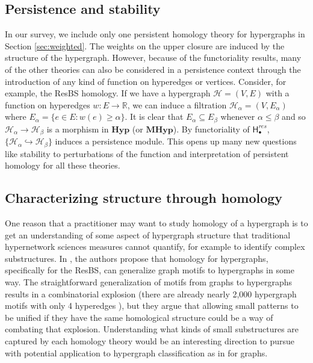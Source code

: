 \documentclass{amsart}
\newcommand{\R}{\mathbb{R}}
\newcommand{\Hyp}{\mathrm{\textbf{Hyp}}}
\newcommand{\MHyp}{\mathrm{\textbf{MHyp}}}
\newcommand{\Hgroup}	     {\mathsf{H}}
\renewcommand{\hom}[2]{\Hgroup_{#2}^{#1}}
\renewcommand{\H}{\mathcal{H}}
\begin{document}
\subsection*{Persistence and stability}
In our survey, we include only one persistent homology theory for hypergraphs in Section \ref{sec:weighted}. The weights on the upper closure are induced by the structure of the hypergraph. However, because of the functoriality results, many of the other theories can also be considered in a persistence context through the introduction of any kind of function on hyperedges or vertices. Consider, for example, the ResBS homology. If we have a hypergraph $\H=(V,E)$ with a function on hyperedges $w : E \rightarrow \R$, we can induce a filtration $\H_\alpha = (V, E_\alpha)$ where $E_\alpha = \{e \in E : w(e) \geq \alpha\}$. It is clear that $E_\alpha \subseteq E_\beta$ whenever $\alpha \leq \beta$ and so $\H_\alpha \rightarrow \H_\beta$ is a morphism in $\Hyp$ (or $\MHyp$). By functoriality of $\hom{res}{\bullet}$, $\{\H_\alpha \hookrightarrow \H_\beta\}$ induces a persistence module. This opens up many new questions like stability to perturbations of the function and interpretation of persistent homology for all these theories. 

\subsection*{Characterizing structure through homology}
One reason that a practitioner may want to study homology of a hypergraph is to get an understanding of some aspect of hypergraph structure that traditional hypernetwork sciences measures cannot quantify, for example to identify complex substructures. In \cite{jenne2023stepping}, the authors propose that homology for hypergraphs, specifically for the ResBS, can generalize graph motifs to hypergraphs in some way. The straightforward generalization of motifs from graphs to hypergraphs results in a combinatorial explosion (there are already nearly 2,000 hypergraph motifs with only 4 hyperedges \cite{lee2020hypergraph}), but they argue that allowing small patterns to be unified if they have the same homological structure could be a way of combating that explosion. Understanding what kinds of small substructures are captured by each homology theory would be an interesting direction to pursue with potential application to hypergraph classification as in \cite{milo2002network} for graphs.
\end{document}
